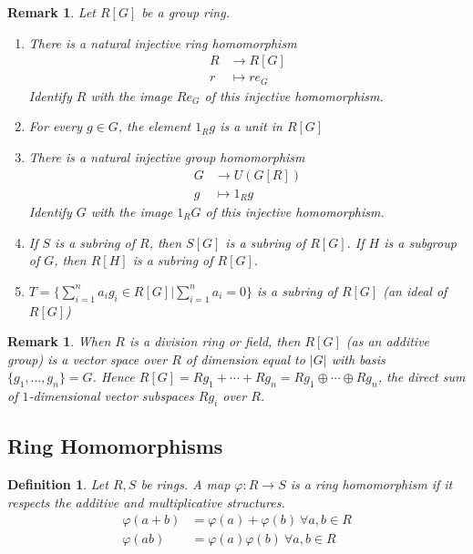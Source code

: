 \documentclass[a4paper,8pt]{article}
\newcommand{\hlt}[1]{\textit{{\color{blue}#1}}}
\theoremstyle{theorem}
\newtheorem{definition}[theorem]{Definition}
\newtheorem{remark}[theorem]{Remark}
\begin{document}
\begin{remark}
Let $R[G]$ be a group ring.
\begin{enumerate}[label=(\roman*)]
\item There is a natural injective ring homomorphism 
\begin{align}
R &\rightarrow R[G] \nonumber \\
r &\mapsto r e_G \nonumber
\end{align}
Identify $R$ with the image $R e_G$ of this injective homomorphism.
\item For every $g \in G$, the element $1_R g$ is a unit in $R[G]$
\item There is a natural injective group homomorphism 
\begin{align}
G &\rightarrow U(G[R]) \nonumber \\
g &\mapsto 1_R g \nonumber
\end{align}
Identify $G$ with the image $1_R G$ of this injective homomorphism.
\item If $S$ is a subring of $R$, then $S[G]$ is a subring of $R[G]$. If $H$ is a subgroup of $G$, then $R[H]$ is a subring of $R[G]$.
\item $T = \{\sum_{i=1}^{n} a_i g_i \in R[G] | \sum_{i=1}^{n} a_i = 0\}$ is a subring of $R[G]$ (an ideal of $R[G]$)
\end{enumerate}
\end{remark}


\begin{remark}
When $R$ is a division ring or field, then $R[G]$ (as an additive group) is a vector space over $R$ of dimension equal to $\left| G \right|$ with basis $\{g_1, \ldots, g_n\} = G$.
Hence $R[G] = Rg_1 + \cdots + Rg_n = Rg_1 \oplus \cdots \oplus Rg_n$, the direct sum of $1$-dimensional vector subspaces $Rg_i$ over $R$.\\
\end{remark}


\subsection{Ring Homomorphisms}

\begin{definition}
Let $R, S$ be rings. A map $\varphi: R \rightarrow S$ is a \hlt{ring homomorphism} if it respects the additive and multiplicative structures.\\
\begin{align}
\varphi(a+b) &= \varphi(a) + \varphi(b) \ \forall a, b \in R \nonumber \\
\varphi(ab) &= \varphi(a)\varphi(b) \ \forall a, b \in R \nonumber
\end{align}
\end{definition}
\end{document}
